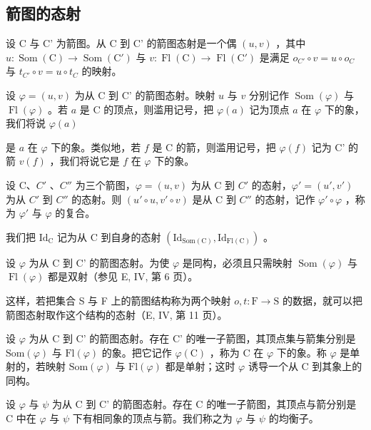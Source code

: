 \subsection{箭图的态射}

设 C 与 C' 为箭图。从 C 到 C' 的箭图态射是一个偶 \((u,v)\) ，其中 \(u\colon\operatorname{Som}(\mathrm{C})\to\operatorname{Som}(\mathrm{C}')\) 与 \(v\colon\operatorname{Fl}(\mathrm{C})\to\operatorname{Fl}(\mathrm{C}')\) 是满足 \(o_{C'}\circ v=u\circ o_{C}\) 与 \(t_{C'}\circ v=u\circ t_{C}\) 的映射。

设 \(\varphi = (u, v)\) 为从 C 到 C' 的箭图态射。映射 \(u\) 与 \(v\) 分别记作 \(\operatorname{Som}(\varphi)\) 与 \(\operatorname{Fl}(\varphi)\) 。若 \(a\) 是 C 的顶点，则滥用记号，把 \(\varphi(a)\) 记为顶点 \(a\) 在 \(\varphi\) 下的象，我们将说 \(\varphi(a)\)

是 \(a\) 在 \(\varphi\) 下的象。类似地，若 \(f\) 是 C 的箭，则滥用记号，把 \(\varphi(f)\) 记为 C' 的箭 \(v(f)\) ，我们将说它是 \(f\) 在 \(\varphi\) 下的象。

设 C、\(C'\) 、\(C''\) 为三个箭图，\(\varphi = (u, v)\) 为从 C 到 \(C'\) 的态射，\(\varphi' = (u', v')\) 为从 \(C'\) 到 \(C''\) 的态射。则 \((u' \circ u, v' \circ v)\) 是从 C 到 \(C''\) 的态射，记作 \(\varphi' \circ \varphi\) ，称为 \(\varphi'\) 与 \(\varphi\) 的复合。

我们把 \(\mathrm{Id}_{\mathrm{C}}\) 记为从 C 到自身的态射 \((\mathrm{Id}_{\mathrm{Som}(\mathrm{C})}, \mathrm{Id}_{\mathrm{Fl}(\mathrm{C})})\) 。

设 \(\varphi\) 为从 C 到 C' 的箭图态射。为使 \(\varphi\) 是同构，必须且只需映射 \(\operatorname{Som}(\varphi)\) 与 \(\operatorname{Fl}(\varphi)\) 都是双射（参见 E, IV, 第 6 页）。

这样，若把集合 S 与 F 上的箭图结构称为两个映射 \(o, t: \mathrm{F} \to \mathrm{S}\) 的数据，就可以把箭图态射取作这个结构的态射（E, IV, 第 11 页）。

设 \(\varphi\) 为从 C 到 C' 的箭图态射。存在 C' 的唯一子箭图，其顶点集与箭集分别是 \(\mathrm{Som}(\varphi)\) 与 \(\mathrm{Fl}(\varphi)\) 的象。把它记作 \(\varphi(\mathrm{C})\) ，称为 C 在 \(\varphi\) 下的象。称 \(\varphi\) 是单射的，若映射 \(\mathrm{Som}(\varphi)\) 与 \(\mathrm{Fl}(\varphi)\) 都是单射；这时 \(\varphi\) 诱导一个从 C 到其象上的同构。

设 \(\varphi\) 与 \(\psi\) 为从 C 到 C' 的箭图态射。存在 C 的唯一子箭图，其顶点与箭分别是 C 中在 \(\varphi\) 与 \(\psi\) 下有相同象的顶点与箭。我们称之为 \(\varphi\) 与 \(\psi\) 的均衡子。


